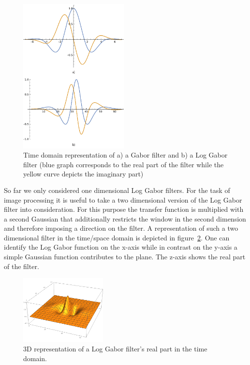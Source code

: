 \documentclass[journal]{IEEEtran}
\begin{document}
\begin{figure}[t]
\centering
  \includegraphics[width=0.49\textwidth]{iris/impulse_response}
	\caption{Time domain representation of a) a Gabor filter and b) a Log Gabor filter (blue graph corresponds to the real part of the filter while the yellow curve depicts the imaginary part)}
	\label{fig:impulse_response}
\end{figure}

\par So far we only considered one dimensional Log Gabor filters. For the task of image processing it is useful to take a two dimensional version of the Log Gabor filter into consideration. For this purpose the transfer function is multiplied with a second Gaussian that additionally restricts the window in the second dimension and therefore imposing a direction on the filter. A representation of such a two dimensional filter in the time/space domain is depicted in figure~\ref{fig:2Dloggabor}. One can identify the Log Gabor function on the x-axis while in contrast on the y-axis a simple Gaussian function contributes to the plane. The z-axis shows the real part of the filter.

\begin{figure}[H]
\centering
  \includegraphics[width=0.39\textwidth]{iris/log_gabor_2d.png}
	\caption{3D representation of a Log Gabor filter's real part in the time domain.}
	\label{fig:2Dloggabor}
\end{figure}
\end{document}
